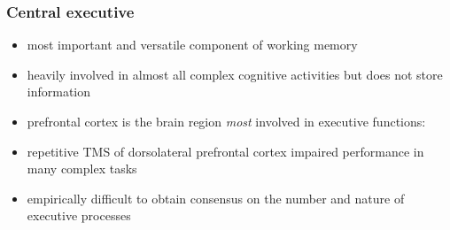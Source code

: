 \documentclass[]{beamer}
\begin{document}
\begin{frame}
 \frametitle{Central executive}
\begin{overlayarea}{110mm}{80mm}
\begin{itemize}
 \item most important and versatile component of working memory
 \item heavily involved in almost all complex cognitive activities but does not store information
 \item prefrontal cortex is the brain region \textit{most} involved in executive functions:
 \item[] repetitive TMS of dorsolateral prefrontal cortex impaired performance in many complex tasks
\end{itemize}

\begin{itemize}
 \item<3-> empirically difficult to obtain consensus on the number and nature of executive processes 
\end{itemize}
\end{overlayarea}
\end{frame}
\end{document}
